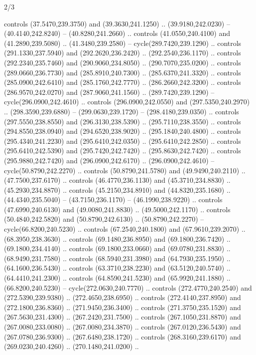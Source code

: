 \begin{flagdescription}{2/3}
\begin{scope}[xshift=0.5\flaglength,yshift=0.5\flagwidth,scale=\stretchfactor]
\begin{scope}[scale=0.001645\flagwidth,yshift=65mm,xshift=-63mm]
\begin{scope}[y=0.80pt, x=0.80pt, yscale=-1,]
\begin{scope}[cm={{1.33333,0.0,0.0,1.33333,(0.0,1e-05)}}]
  controls (37.5470,239.3750) and (39.3630,241.1250) .. (39.9180,242.0230) --
  (40.4140,242.8240) -- (40.8280,241.2660) .. controls (41.0550,240.4100) and
  (41.2890,239.5080) .. (41.3480,239.2580) -- cycle(289.7420,239.1290) ..
  controls (291.1330,237.5940) and (292.2620,236.2420) .. (292.2540,236.1170) ..
  controls (292.2340,235.7460) and (290.9060,234.8050) .. (290.7070,235.0200) ..
  controls (289.0660,236.7730) and (285.8910,240.7300) .. (285.6370,241.3320) ..
  controls (285.0900,242.6410) and (285.1760,242.7770) .. (286.2660,242.3200) ..
  controls (286.9570,242.0270) and (287.9060,241.1560) .. (289.7420,239.1290) --
  cycle(296.0900,242.4610) .. controls (296.0900,242.0550) and
  (297.5350,240.2970) .. (298.3590,239.6880) -- (299.0630,239.1720) --
  (298.4180,239.0350) .. controls (297.5550,238.8550) and (296.3130,238.5390) ..
  (295.7110,238.3550) .. controls (294.8550,238.0940) and (294.6520,238.9020) ..
  (295.1840,240.4800) .. controls (295.4340,241.2230) and (295.6410,242.0350) ..
  (295.6410,242.2850) .. controls (295.6410,242.5390) and (295.7420,242.7420) ..
  (295.8630,242.7420) .. controls (295.9880,242.7420) and (296.0900,242.6170) ..
  (296.0900,242.4610) -- cycle(50.8790,242.2270) .. controls (50.8790,241.5780)
  and (49.9490,240.2110) .. (47.7500,237.6170) .. controls (46.4770,236.1130)
  and (45.3710,234.8830) .. (45.2930,234.8870) .. controls (45.2150,234.8910)
  and (44.8320,235.1680) .. (44.4340,235.5040) -- (43.7150,236.1170) --
  (46.1990,238.9220) .. controls (47.6990,240.6130) and (49.0080,241.8830) ..
  (49.5000,242.1170) .. controls (50.4840,242.5820) and (50.8790,242.6130) ..
  (50.8790,242.2270) -- cycle(66.8200,240.5230) .. controls (67.2540,240.1800)
  and (67.9610,239.2070) .. (68.3950,238.3630) .. controls (69.1480,236.8950)
  and (69.1800,236.7420) .. (69.1800,234.4140) .. controls (69.1800,233.0660)
  and (69.0780,231.8830) .. (68.9490,231.7580) .. controls (68.5940,231.3980)
  and (64.7930,235.1950) .. (64.1600,236.5430) .. controls (63.3710,238.2230)
  and (63.5120,240.5740) .. (64.4410,241.2300) .. controls (64.8590,241.5230)
  and (65.9920,241.1880) .. (66.8200,240.5230) -- cycle(272.0630,240.7770) ..
  controls (272.4770,240.2540) and (272.5390,239.9380) .. (272.4650,238.6950) ..
  controls (272.4140,237.8950) and (272.1800,236.8360) .. (271.9450,236.3400) ..
  controls (271.3750,235.1520) and (267.5630,231.4300) .. (267.2420,231.7500) ..
  controls (267.1050,231.8870) and (267.0080,233.0080) .. (267.0080,234.3870) ..
  controls (267.0120,236.5430) and (267.0780,236.9300) .. (267.6480,238.1720) ..
  controls (268.3160,239.6170) and (269.0230,240.4260) .. (270.1480,241.0200) ..

\end{scope}
\end{scope}
\end{scope}
\end{scope}
\end{flagdescription}
